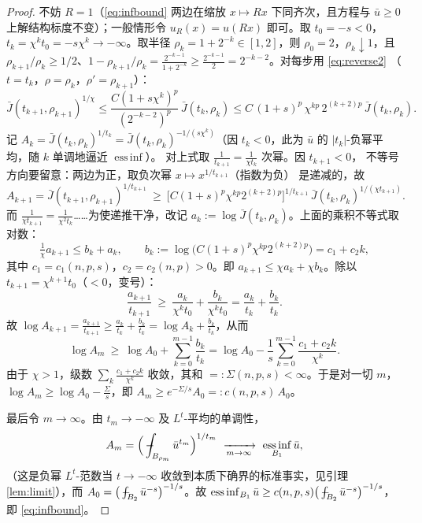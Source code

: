 \documentclass[11pt]{ctexart}
\newcommand{\fint}{\,\rlap{$-$}\!\int}
\DeclareMathOperator*{\essinf}{ess\,inf}
\newcommand{\ub}{\bar{u}}
\theoremstyle{plain}
\theoremstyle{definition}
\begin{document}
\begin{proof}
不妨 $R=1$（\eqref{eq:infbound} 两边在缩放 $x\mapsto Rx$ 下同齐次，且方程与
$\ub\ge0$ 上解结构标度不变）；一般情形令 $u_R(x)=u(Rx)$ 即可。取
$t_0=-s<0$，$t_k=\chi^k t_0=-s\chi^k\to-\infty$。取半径
$\rho_k=1+2^{-k}\in[1,2]$，则 $\rho_0=2$，$\rho_k\downarrow1$，且
$\rho_{k+1}/\rho_k\ge1/2$、$1-\rho_{k+1}/\rho_k=\frac{2^{-k-1}}{1+2^{-k}}
\ge\frac{2^{-k-1}}{2}=2^{-k-2}$。对每步用 \eqref{eq:reverse2}
（$t=t_k$，$\rho=\rho_k$，$\rho'=\rho_{k+1}$）：
\[
\bar J(t_{k+1},\rho_{k+1})^{1/\chi}
\le \frac{C(1+s\chi^k)^p}{(2^{-k-2})^p}\,\bar J(t_k,\rho_k)
\le C\,(1+s)^p\,\chi^{kp}\,2^{(k+2)p}\,\bar J(t_k,\rho_k).
\]
记 $A_k=\bar J(t_k,\rho_k)^{1/t_k}=\bar J(t_k,\rho_k)^{-1/(s\chi^k)}$（因
$t_k<0$，此为 $\ub$ 的 $|t_k|$-负幂平均，随 $k$ 单调地逼近 $\essinf$）。
对上式取 $\frac{1}{t_{k+1}}=\frac{1}{\chi t_k}$ 次幂。因 $t_{k+1}<0$，
不等号方向要留意：两边为正，取负次幂 $x\mapsto x^{1/t_{k+1}}$（指数为负）
是递减的，故
\[
A_{k+1}=\bar J(t_{k+1},\rho_{k+1})^{1/t_{k+1}}
\ \ge\ \big[C(1+s)^p\chi^{kp}2^{(k+2)p}\big]^{1/t_{k+1}}
\,\bar J(t_k,\rho_k)^{1/(\chi t_{k+1})}.
\]
而 $\frac{1}{\chi t_{k+1}}=\frac{1}{\chi^2 t_k}$……为使递推干净，改记
$a_k:=\log \bar J(t_k,\rho_k)$。上面的乘积不等式取对数：
\[
\tfrac1\chi a_{k+1}\le b_k+a_k,\qquad
b_k:=\log\!\big(C(1+s)^p\chi^{kp}2^{(k+2)p}\big)=c_1+c_2 k,
\]
其中 $c_1=c_1(n,p,s)$，$c_2=c_2(n,p)>0$。即
$a_{k+1}\le\chi a_k+\chi b_k$。除以 $t_{k+1}=\chi^{k+1}t_0$（$<0$，变号）：
\[
\frac{a_{k+1}}{t_{k+1}}\ \ge\ \frac{a_k}{\chi^k t_0}
+\frac{b_k}{\chi^k t_0}
=\frac{a_k}{t_k}+\frac{b_k}{t_k}.
\]
故 $\log A_{k+1}=\frac{a_{k+1}}{t_{k+1}}\ge\frac{a_k}{t_k}
+\frac{b_k}{t_k}=\log A_k+\frac{b_k}{t_k}$，从而
\[
\log A_{m}\ \ge\ \log A_0+\sum_{k=0}^{m-1}\frac{b_k}{t_k}
=\log A_0-\frac1s\sum_{k=0}^{m-1}\frac{c_1+c_2k}{\chi^k}.
\]
由于 $\chi>1$，级数 $\sum_k\frac{c_1+c_2k}{\chi^k}$ 收敛，其和
$=:\Sigma(n,p,s)<\infty$。于是对一切 $m$，
$\log A_m\ge\log A_0-\frac{\Sigma}{s}$，即
$A_m\ge e^{-\Sigma/s}A_0=:c(n,p,s)\,A_0$。

最后令 $m\to\infty$。由 $t_m\to-\infty$ 及 $L^{t}$-平均的单调性，
\[
A_m=\Big(\fint_{B_{\rho_m}}\ub^{t_m}\Big)^{1/t_m}
\ \xrightarrow[m\to\infty]{}\ \essinf_{B_1}\ub,
\]
（这是负幂 $L^t$-范数当 $t\to-\infty$ 收敛到本质下确界的标准事实，见引理
\ref{lem:limit}），而 $A_0=\big(\fint_{B_2}\ub^{-s}\big)^{-1/s}$。故
$\essinf_{B_1}\ub\ge c(n,p,s)\big(\fint_{B_2}\ub^{-s}\big)^{-1/s}$，即
\eqref{eq:infbound}。
\end{proof}
\end{document}
